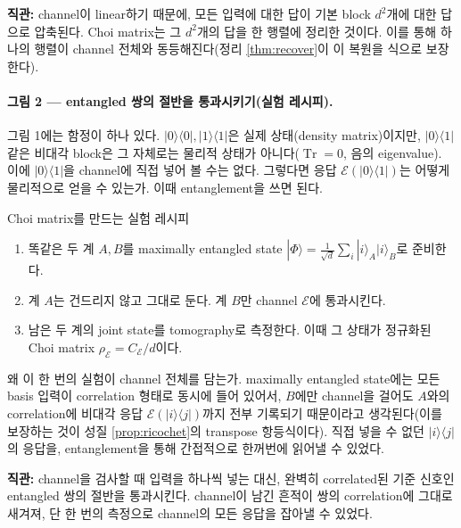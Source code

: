 \documentclass[11pt,a4paper]{article}
\newcommand{\E}{\mathcal{E}}
\newcommand{\Tr}{\operatorname{Tr}}
\theoremstyle{definition}
\theoremstyle{plain}
\theoremstyle{remark}
\begin{document}
\begin{intuitionbox}
\textbf{직관:} channel이 linear하기 때문에, 모든 입력에 대한 답이 기본 block $d^2$개에 대한 답으로 압축된다. Choi matrix는 그 $d^2$개의 답을 한 행렬에 정리한 것이다. 이를 통해 하나의 행렬이 channel 전체와 동등해진다(정리 \ref{thm:recover}이 이 복원을 식으로 보장한다).
\end{intuitionbox}

\paragraph{그림 2 --- entangled 쌍의 절반을 통과시키기(실험 레시피).}
그림 1에는 함정이 하나 있다. $|0\rangle\langle0|,|1\rangle\langle1|$은 실제 상태(density matrix)이지만, $|0\rangle\langle1|$ 같은 비대각 block은 그 자체로는 물리적 상태가 아니다($\Tr=0$, 음의 eigenvalue). 이에 $|0\rangle\langle1|$을 channel에 직접 넣어 볼 수는 없다. 그렇다면 응답 $\E(|0\rangle\langle1|)$는 어떻게 물리적으로 얻을 수 있는가. 이때 entanglement을 쓰면 된다.

\begin{conceptbox}{Choi matrix를 만드는 실험 레시피}
\begin{enumerate}[leftmargin=1.6em]
  \item 똑같은 두 계 $A,B$를 maximally entangled state $|\Phi\rangle=\tfrac1{\sqrt d}\sum_i|i\rangle_A|i\rangle_B$로 준비한다.
  \item 계 $A$는 건드리지 않고 그대로 둔다. 계 $B$만 channel $\E$에 통과시킨다.
  \item 남은 두 계의 joint state를 tomography로 측정한다. 이때 그 상태가 정규화된 Choi matrix $\rho_\E=C_\E/d$이다.
\end{enumerate}
\end{conceptbox}

왜 이 한 번의 실험이 channel 전체를 담는가. maximally entangled state에는 모든 basis 입력이 correlation 형태로 동시에 들어 있어서, $B$에만 channel을 걸어도 $A$와의 correlation에 비대각 응답 $\E(|i\rangle\langle j|)$까지 전부 기록되기 때문이라고 생각된다(이를 보장하는 것이 성질 \ref{prop:ricochet}의 transpose 항등식이다). 직접 넣을 수 없던 $|i\rangle\langle j|$의 응답을, entanglement을 통해 간접적으로 한꺼번에 읽어낼 수 있었다.

\begin{intuitionbox}
\textbf{직관:} channel을 검사할 때 입력을 하나씩 넣는 대신, 완벽히 correlated된 기준 신호인 entangled 쌍의 절반을 통과시킨다. channel이 남긴 흔적이 쌍의 correlation에 그대로 새겨져, 단 한 번의 측정으로 channel의 모든 응답을 잡아낼 수 있었다.
\end{intuitionbox}
\end{document}
